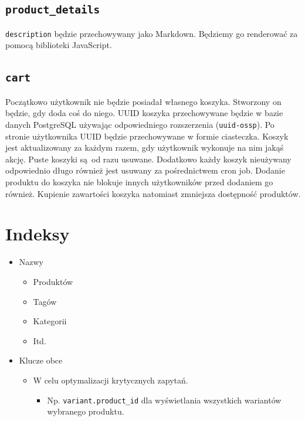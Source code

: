 \subsection*{\texttt{product\_details}}
\texttt{description} będzie przechowywany jako Markdown. Będziemy go renderować za pomocą biblioteki JavaScript.

\subsection*{\texttt{cart}}
Początkowo użytkownik nie będzie posiadał własnego koszyka. Stworzony on będzie, gdy doda coś do niego. UUID koszyka przechowywane będzie w bazie danych PostgreSQL używając odpowiedniego rozszerzenia (\texttt{uuid-ossp}). Po stronie użytkownika UUID będzie przechowywane w formie ciasteczka. Koszyk jest aktualizowany za każdym razem, gdy użytkownik wykonuje na nim jakąś akcję. Puste koszyki są od razu usuwane. Dodatkowo każdy koszyk nieużywany odpowiednio długo również jest usuwany za pośrednictwem cron job. Dodanie produktu do koszyka nie blokuje innych użytkowników przed dodaniem go również. Kupienie zawartości koszyka natomiast zmniejsza dostępność produktów.

\section*{Indeksy}
\begin{itemize}
    \item Nazwy
        \begin{itemize}
            \item Produktów
            \item Tagów
            \item Kategorii
            \item Itd.
        \end{itemize}
    \item Klucze obce
        \begin{itemize}
            \item W celu optymalizacji krytycznych zapytań.
                    \begin{itemize}
                        \item Np. \texttt{variant.product\_id} dla wyświetlania wszystkich wariantów wybranego produktu.
                    \end{itemize}
        \end{itemize}
\end{itemize}

